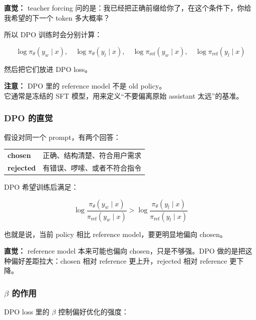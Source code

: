 \begin{intubox}
\textbf{直觉：} teacher forcing 问的是：我已经把正确前缀给你了，在这个条件下，你给我希望的下一个 token 多大概率？
\end{intubox}

所以 DPO 训练时会分别计算：

\[
\log \pi_\theta(y_w \mid x),
\quad
\log \pi_\theta(y_l \mid x),
\quad
\log \pi_\text{ref}(y_w \mid x),
\quad
\log \pi_\text{ref}(y_l \mid x)
\]

然后把它们放进 DPO loss。

\begin{warnbox}
\textbf{注意：} DPO 里的 reference model 不是 old policy。\\
它通常是冻结的 SFT 模型，用来定义“不要偏离原始 assistant 太远”的基准。
\end{warnbox}

\subsubsection{DPO 的直觉}

假设对同一个 prompt，有两个回答：

\begin{center}
{\small
\begin{tabular}{p{2.4cm}p{10.4cm}}
\hline
\textbf{chosen} & 正确、结构清楚、符合用户需求 \\
\textbf{rejected} & 有错误、啰嗦、或者不符合指令 \\
\hline
\end{tabular}
}
\end{center}

DPO 希望训练后满足：

\[
\log
\frac{\pi_\theta(y_w \mid x)}{\pi_\text{ref}(y_w \mid x)}
>
\log
\frac{\pi_\theta(y_l \mid x)}{\pi_\text{ref}(y_l \mid x)}
\]

也就是说，当前 policy 相比 reference model，要更明显地偏向 chosen。

\begin{intubox}
\textbf{直觉：} reference model 本来可能也偏向 chosen，只是不够强。DPO 做的是把这种偏好差距拉大：chosen 相对 reference 更上升，rejected 相对 reference 更下降。
\end{intubox}

\subsubsection{$\beta$ 的作用}

DPO loss 里的 $\beta$ 控制偏好优化的强度：

